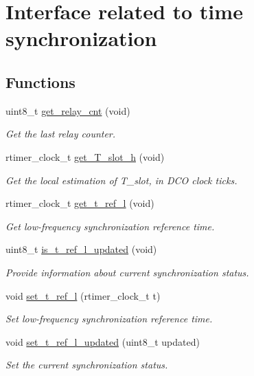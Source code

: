 \hypertarget{group__chaos__sync}{\section{Interface related to time synchronization}
\label{group__chaos__sync}
}
\subsection*{Functions}
\begin{DoxyCompactItemize}
\item 
uint8\-\_\-t \hyperlink{group__chaos__sync_ga2cb03b56f27f6f7f0b4ebf0ec6ba8333}{get\-\_\-relay\-\_\-cnt} (void)
\begin{DoxyCompactList}\small\item\em Get the last relay counter. \end{DoxyCompactList}\item 
rtimer\-\_\-clock\-\_\-t \hyperlink{group__chaos__sync_ga00e1a87bdb504b0819a7b5d6c637eaa8}{get\-\_\-\-T\-\_\-slot\-\_\-h} (void)
\begin{DoxyCompactList}\small\item\em Get the local estimation of T\-\_\-slot, in D\-C\-O clock ticks. \end{DoxyCompactList}\item 
rtimer\-\_\-clock\-\_\-t \hyperlink{group__chaos__sync_gaa37a5474c90f7747d0f5054dc1a03764}{get\-\_\-t\-\_\-ref\-\_\-l} (void)
\begin{DoxyCompactList}\small\item\em Get low-\/frequency synchronization reference time. \end{DoxyCompactList}\item 
uint8\-\_\-t \hyperlink{group__chaos__sync_gae7e475746ec86ae6dd8ca9ece642faf8}{is\-\_\-t\-\_\-ref\-\_\-l\-\_\-updated} (void)
\begin{DoxyCompactList}\small\item\em Provide information about current synchronization status. \end{DoxyCompactList}\item 
void \hyperlink{group__chaos__sync_gac14ac43f69412b67d2d326b32c2d9014}{set\-\_\-t\-\_\-ref\-\_\-l} (rtimer\-\_\-clock\-\_\-t t)
\begin{DoxyCompactList}\small\item\em Set low-\/frequency synchronization reference time. \end{DoxyCompactList}\item 
void \hyperlink{group__chaos__sync_ga189faa7cc7395e8895e1ddcbd645f14e}{set\-\_\-t\-\_\-ref\-\_\-l\-\_\-updated} (uint8\-\_\-t updated)
\begin{DoxyCompactList}\small\item\em Set the current synchronization status. \end{DoxyCompactList}\end{DoxyCompactItemize}


